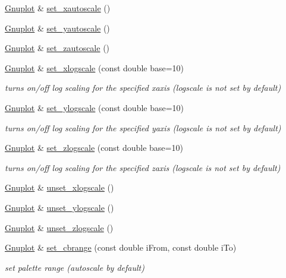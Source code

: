 \begin{DoxyCompactItemize}
\hyperlink{classGnuplot}{\-Gnuplot} \& \hyperlink{classGnuplot_a11a62a04c203f01607c3c21a727e318d}{set\-\_\-xautoscale} ()
\item 
\hyperlink{classGnuplot}{\-Gnuplot} \& \hyperlink{classGnuplot_a5b9e1a4e68f94d418a8e9194f168b448}{set\-\_\-yautoscale} ()
\item 
\hyperlink{classGnuplot}{\-Gnuplot} \& \hyperlink{classGnuplot_aef3e84e793836158e1ddd773d1465c37}{set\-\_\-zautoscale} ()
\item 
\hyperlink{classGnuplot}{\-Gnuplot} \& \hyperlink{classGnuplot_aff546fad227d93babeb5d2cc9f047b89}{set\-\_\-xlogscale} (const double base=10)
\begin{DoxyCompactList}\small\item\em turns on/off log scaling for the specified xaxis (logscale is not set by default) \end{DoxyCompactList}\item 
\hyperlink{classGnuplot}{\-Gnuplot} \& \hyperlink{classGnuplot_a201a802d2f27fece0d39809c4eb3bce0}{set\-\_\-ylogscale} (const double base=10)
\begin{DoxyCompactList}\small\item\em turns on/off log scaling for the specified yaxis (logscale is not set by default) \end{DoxyCompactList}\item 
\hyperlink{classGnuplot}{\-Gnuplot} \& \hyperlink{classGnuplot_a1da3838163b0dbde8809b55c5b5c56b1}{set\-\_\-zlogscale} (const double base=10)
\begin{DoxyCompactList}\small\item\em turns on/off log scaling for the specified zaxis (logscale is not set by default) \end{DoxyCompactList}\item 
\hyperlink{classGnuplot}{\-Gnuplot} \& \hyperlink{classGnuplot_a7b178184260f1498cd0c11a197ea0ac2}{unset\-\_\-xlogscale} ()
\item 
\hyperlink{classGnuplot}{\-Gnuplot} \& \hyperlink{classGnuplot_a9217543dd49c4802b1194d42c5e10b6d}{unset\-\_\-ylogscale} ()
\item 
\hyperlink{classGnuplot}{\-Gnuplot} \& \hyperlink{classGnuplot_afa67f022ca344593b054d7f2e3406c7e}{unset\-\_\-zlogscale} ()
\item 
\hyperlink{classGnuplot}{\-Gnuplot} \& \hyperlink{classGnuplot_a2228f5ab4cce2da463fc90383076a598}{set\-\_\-cbrange} (const double i\-From, const double i\-To)
\begin{DoxyCompactList}\small\item\em set palette range (autoscale by default) \end{DoxyCompactList}\item 

\end{DoxyCompactItemize}
